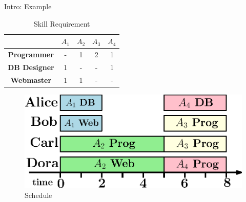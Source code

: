 \documentclass{beamer}
\begin{document}
\begin{frame}{Intro: Example}
\begin{multicols}{2}
		\begin{table}
			\caption{Skill Requirement}
			\begin{tabular}{ccccc}
				\toprule
				 & $A_1$ & $A_2$ & $A_3$ & $A_4$ \\\midrule\midrule
				{\tiny {\bf Programmer}} & - & 1 & 2 & 1 \\
				{\tiny {\bf DB Designer}} & 1 & - & - & 1 \\
				{\tiny {\bf Webmaster}} & 1 & 1 & - & - \\
				\bottomrule
			\end{tabular}
		\end{table}\pause
		\vspace{-8mm}
		\begin{figure}[H]
			\includegraphics[width=\linewidth]{images/sched.eps}
			\caption{Schedule}
		\end{figure}

	\end{multicols}
\end{frame}

\end{document}
